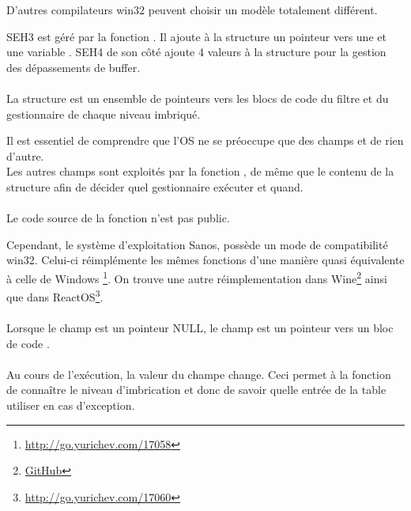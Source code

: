 D'autres compilateurs win32 peuvent choisir un modèle totalement différent.


SEH3 est géré par la fonction . Il ajoute à la structure  
un pointeur vers une  et une variable .
SEH4 de son côté ajoute 4 valeurs à la structure  pour la gestion des dépassements 
de buffer.\\
\\
La structure  est un ensemble de pointeurs vers les blocs de code du filtre et du 
gestionnaire de chaque niveau  imbriqué.



Il est essentiel de comprendre que l'\ac{OS} ne se préoccupe que des champs  et de 
rien d'autre.\\
Les autres champs sont exploités par la fonction , de même que le contenu 
de la structure  afin de décider quel gestionnaire exécuter et quand.\\
\\
Le code source de la fonction  n'est pas public.

Cependant, le système d'exploitation Sanos, possède un mode de compatibilité win32.
Celui-ci réimplémente les mêmes fonctions d'une manière quasi équivalente à celle de Windows
\footnote{\url{http://go.yurichev.com/17058}}.
On trouve une autre réimplementation dans Wine\footnote{\href{http://go.yurichev.com/17059}{GitHub}}
ainsi que dans ReactOS\footnote{\url{http://go.yurichev.com/17060}}.\\
\\
Lorsque le champ  est un pointeur NULL, le champ  est un pointeur vers un 
bloc de code .\\
\\
Au cours de l'exécution, la valeur du champe  change. Ceci permet à la 
fonction  de connaître le niveau d'imbrication et donc de savoir quelle 
entrée de la table  utiliser en cas d'exception.






